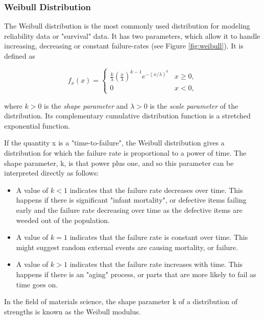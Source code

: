 \subsubsection{Weibull Distribution}

The Weibull distribution is the most commonly used distribution for modeling reliability data or "survival" data. It has two parameters, which allow it to handle increasing, decreasing or constant failure-rates (see Figure \ref{fig:weibull}).
It is defined as

\begin{equation}\label{eq:weibull}
f_x (x) =
  \begin{cases}
    \frac{k}{\lambda}\left(\frac{x}{\lambda}\right)^{k-1}e^{-(x/\lambda)^{k}} & x\geq0 ,\\
    0 & x<0 ,
    \end{cases}
\end{equation}

where $k > 0$ is the \emph{shape parameter }and $\lambda > 0$ is the \emph{scale parameter }of the distribution. Its complementary cumulative distribution function is a stretched exponential function.

If the quantity x is a "time-to-failure", the Weibull distribution gives a distribution for which the failure rate is proportional to a power of time. The shape parameter, k, is that power plus one, and so this parameter can be interpreted directly as follows:

\begin{itemize}
  \item  A value of $k < 1$ indicates that the failure rate decreases over time. This happens if there is significant "infant mortality", or defective items failing early and the failure rate decreasing over time as the defective items are weeded out of the population.

  \item  A value of $k = 1$ indicates that the failure rate is constant over time. This might suggest random external events are causing mortality, or failure.
  \item  A value of $k > 1$ indicates that the failure rate increases with time. This happens if there is an "aging" process, or parts that are more likely to fail as time goes on.
\end{itemize}

In the field of materials science, the shape parameter k of a distribution of strengths is known as the Weibull modulus.

